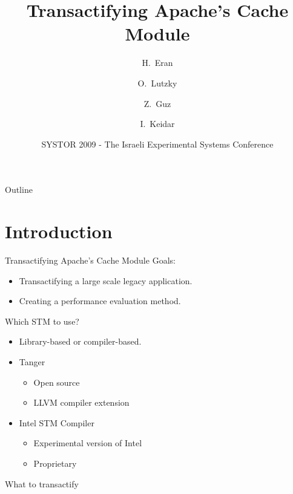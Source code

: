 \documentclass[]{beamer}
\title{Transactifying Apache's Cache Module}
\author[Haggai Eran, Ohad Lutzky, Zvika Guz, Idit Keidar]
{H.~Eran \and O.~Lutzky \and Z.~Guz \and I.~Keidar}
\institute
{
    Department of Electrical Engineering\\
    Technion - Israel Institute of Technology
\and
    \pgfuseimage{technion-logo-large}
}
\date[SYSTOR'09]
{SYSTOR 2009 - The Israeli Experimental Systems Conference}
\newcommand{\Tanger}{{\sc Tanger}}
\begin{document}
\begin{frame}
    \titlepage
\end{frame}


\begin{frame}{Outline}
  \tableofcontents
\end{frame}

\section{Introduction}

\begin{frame}{Transactifying Apache's Cache Module}
    Goals:
    \begin{itemize}
        \item Transactifying a large scale legacy application.
        \item Creating a performance evaluation method.
    \end{itemize}    
\end{frame}

\begin{frame}{Which STM to use?}
    \begin{itemize}
        \item Library-based or compiler-based.
        \item {\Tanger}
            \begin{itemize}
                \item Open source
                \item LLVM compiler extension
            \end{itemize}
        \item Intel STM Compiler
            \begin{itemize}
                \item Experimental version of Intel
                \item Proprietary
            \end{itemize}
    \end{itemize}
\end{frame}

\begin{frame}{What to transactify}
\end{frame}
\end{document}
